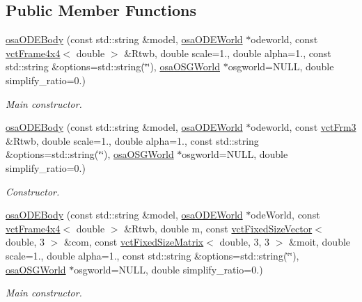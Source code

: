 \subsection*{Public Member Functions}
\begin{DoxyCompactItemize}
\item 
\hyperlink{classosa_o_d_e_body_a80ecbd3ff62439edbd5d889975637db0}{osa\-O\-D\-E\-Body} (const std\-::string \&model, \hyperlink{classosa_o_d_e_world}{osa\-O\-D\-E\-World} $\ast$odeworld, const \hyperlink{classvct_frame4x4}{vct\-Frame4x4}$<$ double $>$ \&Rtwb, double scale=1., double alpha=1., const std\-::string \&options=std\-::string(\char`\"{}\char`\"{}), \hyperlink{classosa_o_s_g_world}{osa\-O\-S\-G\-World} $\ast$osgworld=N\-U\-L\-L, double simplify\-\_\-ratio=0.)
\begin{DoxyCompactList}\small\item\em Main constructor. \end{DoxyCompactList}\item 
\hyperlink{classosa_o_d_e_body_ac4b5693d1f91faa9690659f79c4a607c}{osa\-O\-D\-E\-Body} (const std\-::string \&model, \hyperlink{classosa_o_d_e_world}{osa\-O\-D\-E\-World} $\ast$odeworld, const \hyperlink{vct_transformation_types_8h_a81feda0a02c2d1bc26e5553f409fed20}{vct\-Frm3} \&Rtwb, double scale=1., double alpha=1., const std\-::string \&options=std\-::string(\char`\"{}\char`\"{}), \hyperlink{classosa_o_s_g_world}{osa\-O\-S\-G\-World} $\ast$osgworld=N\-U\-L\-L, double simplify\-\_\-ratio=0.)
\begin{DoxyCompactList}\small\item\em Constructor. \end{DoxyCompactList}\item 
\hyperlink{classosa_o_d_e_body_a7a841b5bf9c7aeb447dd84670e2dadb8}{osa\-O\-D\-E\-Body} (const std\-::string \&model, \hyperlink{classosa_o_d_e_world}{osa\-O\-D\-E\-World} $\ast$ode\-World, const \hyperlink{classvct_frame4x4}{vct\-Frame4x4}$<$ double $>$ \&Rtwb, double m, const \hyperlink{classvct_fixed_size_vector}{vct\-Fixed\-Size\-Vector}$<$ double, 3 $>$ \&com, const \hyperlink{classvct_fixed_size_matrix}{vct\-Fixed\-Size\-Matrix}$<$ double, 3, 3 $>$ \&moit, double scale=1., double alpha=1., const std\-::string \&options=std\-::string(\char`\"{}\char`\"{}), \hyperlink{classosa_o_s_g_world}{osa\-O\-S\-G\-World} $\ast$osgworld=N\-U\-L\-L, double simplify\-\_\-ratio=0.)
\begin{DoxyCompactList}\small\item\em Main constructor. \end{DoxyCompactList}\item 

\end{DoxyCompactItemize}
